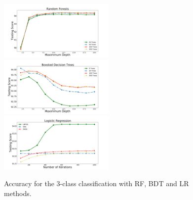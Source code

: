 \begin{figure}[h]
\center
\includegraphics[width=0.5\textwidth]{plots/rf_train_multi.pdf}\\
\includegraphics[width=0.5\textwidth]{plots/bdt_train_multi.pdf}
\includegraphics[width=0.5\textwidth]{plots/lr_train_multi.pdf}
\caption{Accuracy for the 3-class classification with RF, BDT and LR  methods.
}
\label{fig:tree_multi}
\end{figure}

